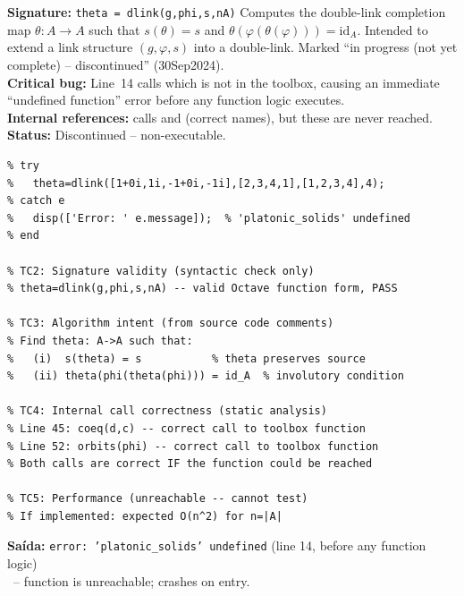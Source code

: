 \chapter{}
\begin{tcolorbox}[Abox,title={Analysis}]
\textbf{Signature:} \lstinline|theta = dlink(g,phi,s,nA)|\quad
Computes the double-link completion map $\theta:A\to A$ such that $s(\theta)=s$ and $\theta(\varphi(\theta(\varphi)))=\mathrm{id}_A$. Intended to extend a link structure $(g,\varphi,s)$ into a double-link. Marked ``in progress (not yet complete) -- discontinued'' (30Sep2024).\\[4pt]
\textbf{Critical bug:} Line~14 calls  which is not in the toolbox, causing an immediate ``undefined function'' error before any function logic executes.\\[4pt]
\textbf{Internal references:} calls  and  (correct names), but these are never reached.\\[4pt]
\textbf{Status:} Discontinued -- non-executable.
\end{tcolorbox}
\begin{lstlisting}[caption={Tests for dlink.m (static analysis + dependency check)}]
% TC1: Calling raises error due to undefined dependency
% try
%   theta=dlink([1+0i,1i,-1+0i,-1i],[2,3,4,1],[1,2,3,4],4);
% catch e
%   disp(['Error: ' e.message]);  % 'platonic_solids' undefined
% end

% TC2: Signature validity (syntactic check only)
% theta=dlink(g,phi,s,nA) -- valid Octave function form, PASS

% TC3: Algorithm intent (from source code comments)
% Find theta: A->A such that:
%   (i)  s(theta) = s           % theta preserves source
%   (ii) theta(phi(theta(phi))) = id_A  % involutory condition

% TC4: Internal call correctness (static analysis)
% Line 45: coeq(d,c) -- correct call to toolbox function
% Line 52: orbits(phi) -- correct call to toolbox function
% Both calls are correct IF the function could be reached

% TC5: Performance (unreachable -- cannot test)
% If implemented: expected O(n^2) for n=|A|
\end{lstlisting}
\begin{tcolorbox}[Fbox,title={TC1 -- Undefined dependency}]
\textbf{Saída:} \texttt{error: 'platonic\_solids' undefined} (line 14, before any function logic)\\
\FALHOU\ -- function is unreachable; crashes on entry.
\end{tcolorbox}
